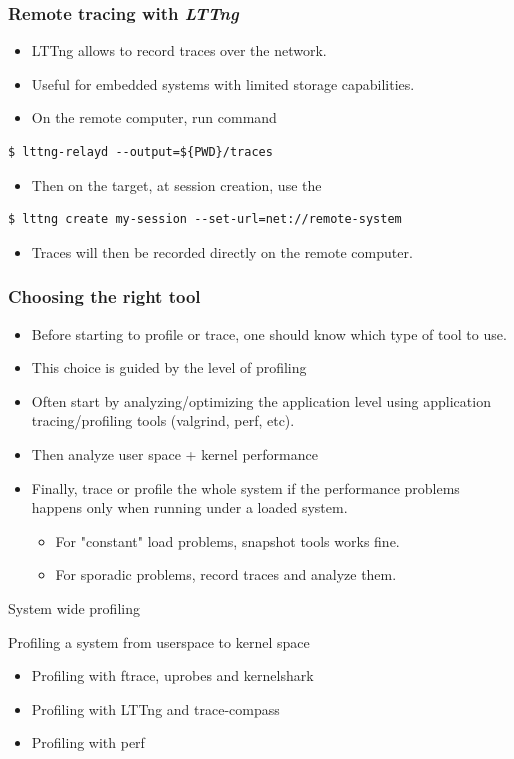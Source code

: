 \begin{frame}[fragile]
  \frametitle{Remote tracing with {\em LTTng}}
  \begin{itemize}
    \item LTTng allows to record traces over the network.
    \item Useful for embedded systems with limited storage capabilities.
    \item On the remote computer, run  command
  \end{itemize}
  \begin{block}{}
    \begin{verbatim}
$ lttng-relayd --output=${PWD}/traces
   \end{verbatim}
  \end{block}
  \begin{itemize}
    \item Then on the target, at session creation, use the 
  \end{itemize}
  \begin{block}{}
    \begin{verbatim}
$ lttng create my-session --set-url=net://remote-system
   \end{verbatim}
  \end{block}
  \begin{itemize}
    \item Traces will then be recorded directly on the remote computer.
  \end{itemize}
\end{frame}

\begin{frame}[fragile]
  \frametitle{Choosing the right tool}
  \begin{itemize}
    \item Before starting to profile or trace, one should know which type of
          tool to use.
    \item This choice is guided by the level of profiling
    \item Often start by analyzing/optimizing the application level using
          application tracing/profiling tools (valgrind, perf, etc).
    \item Then analyze user space + kernel performance
    \item Finally, trace or profile the whole system if the performance problems
          happens only when running under a loaded system.
    \begin{itemize}
      \item For "constant" load problems, snapshot tools works fine.
      \item For sporadic problems, record traces and analyze them.
    \end{itemize}
  \end{itemize}
\end{frame}

\setuplabframe
{System wide profiling}
{
  Profiling a system from userspace to kernel space
  \begin{itemize}
    \item Profiling with ftrace, uprobes and kernelshark
    \item Profiling with LTTng and trace-compass
    \item Profiling with perf
  \end{itemize}
}
